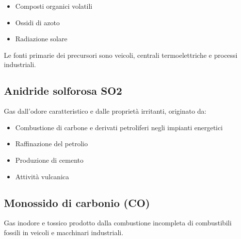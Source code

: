 \begin{itemize}
  \item Composti organici volatili
  \item Ossidi di azoto
  \item Radiazione solare
\end{itemize}

Le fonti primarie dei precursori sono veicoli, centrali termoelettriche e processi industriali.

\subsection{Anidride solforosa SO2}

Gas dall'odore caratteristico e dalle proprietà irritanti, originato da:

\begin{itemize}
  \item Combustione di carbone e derivati petroliferi negli impianti energetici
  \item Raffinazione del petrolio
  \item Produzione di cemento
  \item Attività vulcanica
\end{itemize}

\subsection{Monossido di carbonio (CO)}

Gas inodore e tossico prodotto dalla combustione incompleta di combustibili fossili in veicoli e macchinari industriali.
